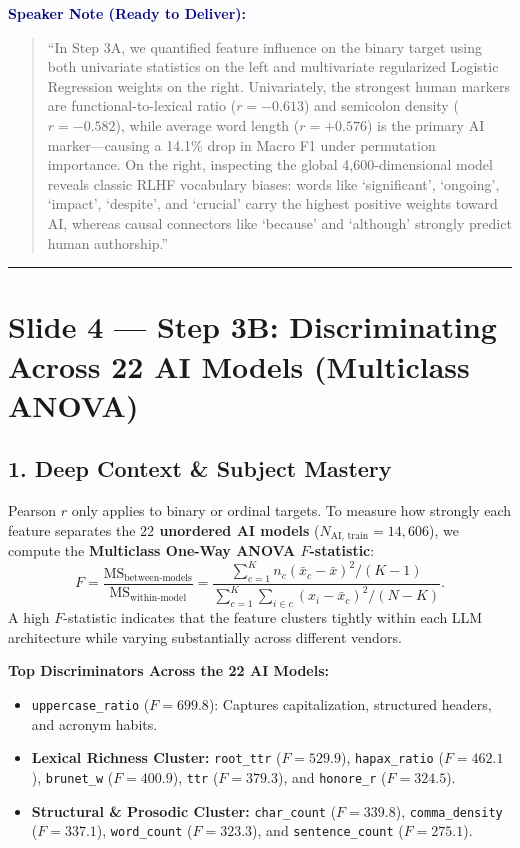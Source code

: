 \documentclass[11pt, a4paper]{article}
\newenvironment{speakernote}{%
    \par\vspace{0.2cm}%
    \noindent\textbf{\textcolor{navy}{Speaker Note (Ready to Deliver):}}\par\vspace{0.1cm}%
    \begin{quote}\itshape\color{slate}%
}{%
    \end{quote}\vspace{0.2cm}%
}
\begin{document}
\begin{speakernote}
``In Step 3A, we quantified feature influence on the binary target using both univariate statistics on the left and multivariate regularized Logistic Regression weights on the right. Univariately, the strongest human markers are functional-to-lexical ratio ($r = -0.613$) and semicolon density ($r = -0.582$), while average word length ($r = +0.576$) is the primary AI marker---causing a 14.1\% drop in Macro F1 under permutation importance. On the right, inspecting the global 4,600-dimensional model reveals classic RLHF vocabulary biases: words like `significant', `ongoing', `impact', `despite', and `crucial' carry the highest positive weights toward AI, whereas causal connectors like `because' and `although' strongly predict human authorship.''
\end{speakernote}

\vspace{0.3cm}\hrule\vspace{0.3cm}

\section{Slide 4 --- Step 3B: Discriminating Across 22 AI Models (Multiclass ANOVA)}

\subsection*{1. Deep Context \& Subject Mastery}
Pearson $r$ only applies to binary or ordinal targets. To measure how strongly each feature separates the \textbf{$22$ unordered AI models} ($N_{\text{AI, train}} = 14,606$), we compute the \textbf{Multiclass One-Way ANOVA $F$-statistic}:
\[
    F = \frac{\text{MS}_{\text{between-models}}}{\text{MS}_{\text{within-model}}}
      = \frac{\sum_{c=1}^{K} n_c (\bar{x}_c - \bar{x})^2 / (K - 1)}{\sum_{c=1}^{K} \sum_{i \in c} (x_{i} - \bar{x}_c)^2 / (N - K)}.
\]
A high $F$-statistic indicates that the feature clusters tightly within each LLM architecture while varying substantially across different vendors.

\noindent\textbf{Top Discriminators Across the 22 AI Models:}
\begin{itemize}[noitemsep]
    \item \texttt{uppercase\_ratio} ($F = 699.8$): Captures capitalization, structured headers, and acronym habits.
    \item \textbf{Lexical Richness Cluster:} \texttt{root\_ttr} ($F = 529.9$), \texttt{hapax\_ratio} ($F = 462.1$), \texttt{brunet\_w} ($F = 400.9$), \texttt{ttr} ($F = 379.3$), and \texttt{honore\_r} ($F = 324.5$).
    \item \textbf{Structural \& Prosodic Cluster:} \texttt{char\_count} ($F = 339.8$), \texttt{comma\_density} ($F = 337.1$), \texttt{word\_count} ($F = 323.3$), and \texttt{sentence\_count} ($F = 275.1$).
\end{itemize}
\end{document}
